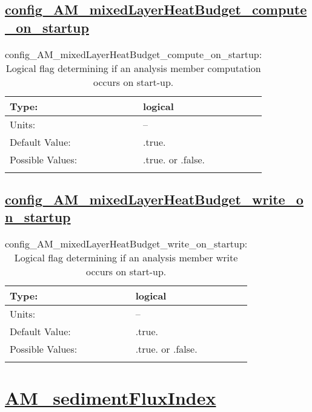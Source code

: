 \subsection[config\_AM\_mixedLayerHeatBudget\_compute\_on\_startup]{\hyperref[sec:nm_tab_AM_mixedLayerHeatBudget]{config\_AM\_mixedLayerHeatBudget\_compute\_on\_startup}}
\label{subsec:nm_sec_config_AM_mixedLayerHeatBudget_compute_on_startup}
\begin{center}
\begin{longtable}{| p{2.0in} || p{4.0in} |}
    \hline
    Type: & logical \\
    \hline
    Units: & -- \\
    \hline
    Default Value: & .true. \\
    \hline
    Possible Values: & .true. or .false. \\
    \hline
    \caption{config\_AM\_mixedLayerHeatBudget\_compute\_on\_startup: Logical flag determining if an analysis member computation occurs on start-up.}
\end{longtable}
\end{center}
\subsection[config\_AM\_mixedLayerHeatBudget\_write\_on\_startup]{\hyperref[sec:nm_tab_AM_mixedLayerHeatBudget]{config\_AM\_mixedLayerHeatBudget\_write\_on\_startup}}
\label{subsec:nm_sec_config_AM_mixedLayerHeatBudget_write_on_startup}
\begin{center}
\begin{longtable}{| p{2.0in} || p{4.0in} |}
    \hline
    Type: & logical \\
    \hline
    Units: & -- \\
    \hline
    Default Value: & .true. \\
    \hline
    Possible Values: & .true. or .false. \\
    \hline
    \caption{config\_AM\_mixedLayerHeatBudget\_write\_on\_startup: Logical flag determining if an analysis member write occurs on start-up.}
\end{longtable}
\end{center}
\section[AM\_sedimentFluxIndex]{\hyperref[sec:nm_tab_AM_sedimentFluxIndex]{AM\_sedimentFluxIndex}}
\label{sec:nm_sec_AM_sedimentFluxIndex}
